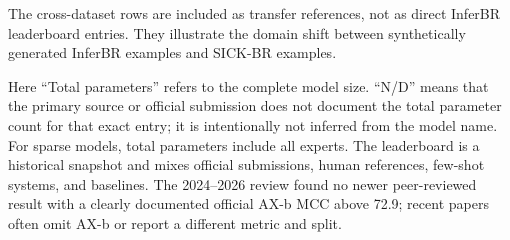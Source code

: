 \documentclass[10pt]{article}
\begin{document}
The cross-dataset rows are included as transfer references, not as direct
InferBR leaderboard entries. They illustrate the domain shift between
synthetically generated InferBR examples and SICK-BR examples.

Here ``Total parameters'' refers to the complete model size. ``N/D'' means
that the primary source or official submission does not document the total
parameter count for that exact entry; it is intentionally not inferred from
the model name. For sparse models, total parameters include all experts. The leaderboard is a historical snapshot and mixes official submissions,
human references, few-shot systems, and baselines. The 2024--2026 review found
no newer peer-reviewed result with a clearly documented official AX-b MCC above
72.9; recent papers often omit AX-b or report a different metric and split.
\end{document}
